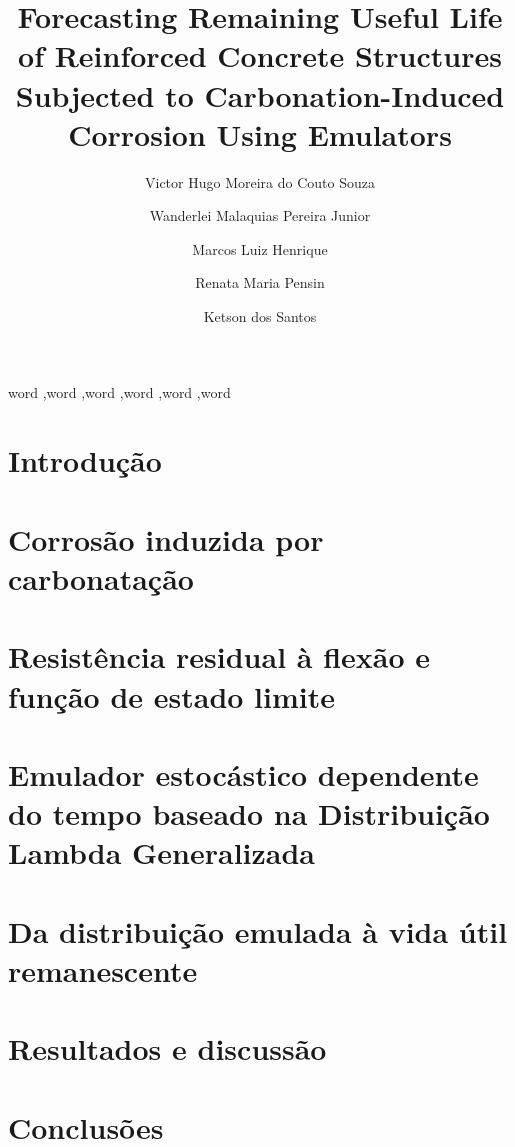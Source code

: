 \documentclass[preprint,11pt]{elsarticle}
\theoremstyle{plain}
\theoremstyle{definition}
\theoremstyle{remark}
\begin{document}
\begin{frontmatter}

\title{Forecasting Remaining Useful Life of Reinforced Concrete Structures Subjected to Carbonation-Induced Corrosion Using Emulators}

\author[label1]{Victor Hugo Moreira do Couto Souza}
\author[label1,label2]{Wanderlei Malaquias Pereira Junior}
\author[label4]{Marcos Luiz Henrique}
\author[label1]{Renata Maria Pensin}
\author[label2,label3]{Ketson dos Santos}
\address[label1]{Federal University of Catalão – UFCAT, Catalão, 75701-180, Goiás, Brazil}
\address[label2]{University of Minnesota, Minneapolis, MN 55455, United States}
\address[label3]{CEGE - UMN Department of Civil, Environmental, and Geo-Engineering, 790 Civil Engineering Bldg, 122, 500 Pillsbury Dr SE, Minneapolis, MN 55455, United States}
\address[label4]{NICEN - Interdisciplinary Center for Exact and Natural Sciences - CA, Caruaru, 55014-900, Pernambuco, Brazil}

\begin{abstract}
\lipsum[1]
\end{abstract}

\begin{keyword}
word \sep word \sep word \sep word \sep word \sep word

\end{keyword}

\end{frontmatter}

\linenumbers

\section{Introdução}\label{sec:intro}
\section{Corrosão induzida por carbonatação}\label{sec:carb}
\section{Resistência residual à flexão e função de estado limite}\label{sec:resist}
\section{Emulador estocástico dependente do tempo baseado na Distribuição Lambda Generalizada}\label{sec:emulador}
\section{Da distribuição emulada à vida útil remanescente}\label{sec:rul}
\section{Resultados e discussão}\label{sec:res}
\section{Conclusões}\label{sec:conc}



\end{document}
